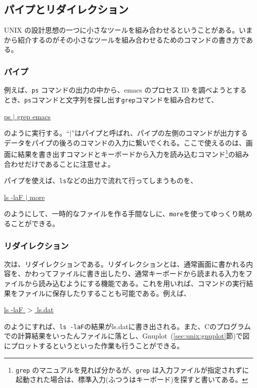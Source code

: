 \subsection{パイプとリダイレクション}

UNIX の設計思想の一つに小さなツールを組み合わせるということがある。いまから紹介するのがその小さなツールを組み合わせるためのコマンドの書き方である。

\subsubsection*{パイプ}
例えば、{\tt ps} コマンドの出力の中から、emacs のプロセス ID を調べようとするとき、{\tt ps}コマンドと文字列を探し出す{\tt grep}コマンドを組み合わせて、
\begin{commandline2}
\prompt \underline{ps $|$ grep emacs}
\end{commandline2} \noindent
のように実行する。``{\tt $|$}''はパイプと呼ばれ、パイプの左側のコマンドが出力するデータをパイプの後ろのコマンドの入力に繋いでくれる。ここで使えるのは、画面に結果を書き出すコマンドとキーボードから入力を読み込むコマンド\footnote{{\tt grep} のマニュアルを見れば分かるが、{\tt grep} は入力ファイルが指定されずに起動された場合は、標準入力(ふつうはキーボード)を探すと書いてある。}の組み合わせだけであることに注意せよ。

パイプを使えば、{\tt ls}などの出力で流れて行ってしまうものを、
\begin{commandline2}
\prompt \underline{ls -laF $|$ more}
\end{commandline2} \noindent
のようにして、一時的なファイルを作る手間なしに、{\tt more}を使ってゆっくり眺めることができる。

\subsubsection*{リダイレクション}
次は、リダイレクションである。リダイレクションとは、通常画面に書かれる内容を、かわってファイルに書き出したり、通常キーボードから読まれる入力をファイルから読み込むようにする機能である。これを用いれば、コマンドの実行結果をファイルに保存したりすることも可能である。例えば、
\begin{commandline2}
\prompt \underline{ls -laF $>$ ls.dat}
\end{commandline2} \noindent
のようにすれば、{\tt ls -laF}の結果がls.datに書き出される。また、Cのプログラムでの計算結果をいったんファイルに落とし、Gnuplot~(\ref{sec:unix:gnuplot}節)で図にプロットするというといった作業も行うことができる。

